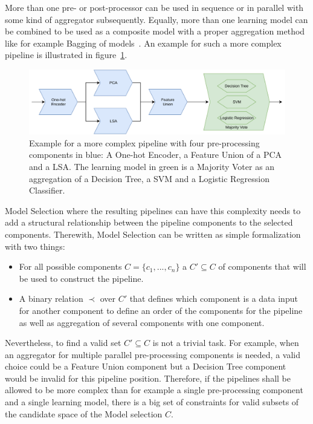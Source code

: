 More than one pre- or post-processor can be used in sequence or in parallel with some kind of aggregator subsequently.
Equally, more than one learning model can be combined to be used as a composite model with a proper aggregation method like for example Bagging of models~\cite{Breiman-BaggingPredictors}.
An example for such a more complex pipeline is illustrated in figure~\ref{fig:theory:complexPipeline}.\newline
\begin{figure}[ht!]
    \centering
    \includegraphics[width=\textwidth]{gfx/Figures/Theory/ComplexPipeline.pdf}
    \caption{Example for a more complex pipeline with four pre-processing components in blue: A One-hot Encoder, a Feature Union of a PCA and a LSA. The learning model in green is a Majority Voter as an aggregation of a Decision Tree, a SVM and a Logistic Regression Classifier. }
	\label{fig:theory:complexPipeline}
\end{figure}
Model Selection where the resulting pipelines can have this complexity needs to add a structural relationship between the pipeline components to the selected components.
Therewith, Model Selection can be written as simple formalization with two things:
\begin{itemize}
    \item For all possible components $C=\{c_1, ..., c_n\}$ a $C' \subseteq C$ of components that will be used to construct the pipeline.
    \item A binary relation $\prec$ over $C'$ that defines which component is a data input for another component to define an order of the components for the pipeline as well as aggregation of several components with one component. 
\end{itemize}
Nevertheless, to find a valid set $C' \subseteq C$ is not a trivial task.
For example, when an aggregator for multiple parallel pre-processing components is needed, a valid choice could be a Feature Union component but a Decision Tree component would be invalid for this pipeline position.
Therefore, if the pipelines shall be allowed to be more complex than for example a single pre-processing component and a single learning model, there is a big set of constraints for valid subsets of the candidate space of the Model selection $C$.

